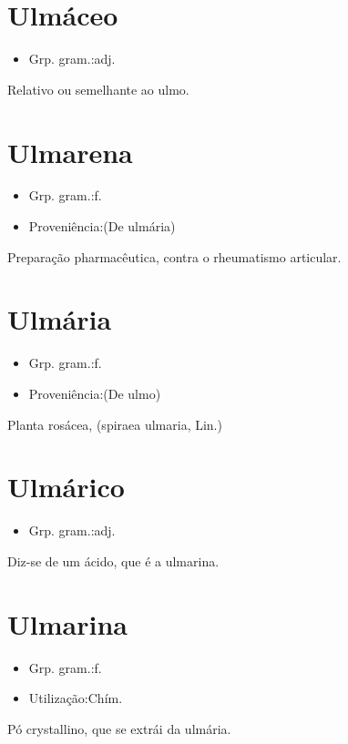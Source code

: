 \documentclass{article}
\begin{document}
\section{Ulmáceo}
\begin{itemize}
\item {Grp. gram.:adj.}
\end{itemize}
Relativo ou semelhante ao ulmo.
\section{Ulmarena}
\begin{itemize}
\item {Grp. gram.:f.}
\end{itemize}
\begin{itemize}
\item {Proveniência:(De \textunderscore ulmária\textunderscore )}
\end{itemize}
Preparação pharmacêutica, contra o rheumatismo articular.
\section{Ulmária}
\begin{itemize}
\item {Grp. gram.:f.}
\end{itemize}
\begin{itemize}
\item {Proveniência:(De \textunderscore ulmo\textunderscore )}
\end{itemize}
Planta rosácea, (\textunderscore spiraea ulmaria\textunderscore , Lin.)
\section{Ulmárico}
\begin{itemize}
\item {Grp. gram.:adj.}
\end{itemize}
Diz-se de um ácido, que é a ulmarina.
\section{Ulmarina}
\begin{itemize}
\item {Grp. gram.:f.}
\end{itemize}
\begin{itemize}
\item {Utilização:Chím.}
\end{itemize}
Pó crystallino, que se extrái da ulmária.
\end{document}
